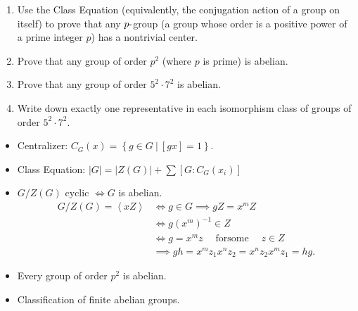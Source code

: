 \begin{enumerate}
\def\labelenumi{\alph{enumi}.}
\item
  Use the Class Equation (equivalently, the conjugation action of a
  group on itself) to prove that any \(p{\hbox{-}}\)group (a group whose
  order is a positive power of a prime integer \(p\)) has a nontrivial
  center.
\item
  Prove that any group of order \(p^2\) (where \(p\) is prime) is
  abelian.
\item
  Prove that any group of order \(5^2 \cdot 7^2\) is abelian.
\item
  Write down exactly one representative in each isomorphism class of
  groups of order \(5^2 \cdot 7^2\).
\end{enumerate}

\begin{concept}

\envlist

\begin{itemize}
\item
  Centralizer:
  \(C_G(x) = \left\{{g\in G {~\mathrel{\Big|}~}[gx] = 1}\right\}\).
\item
  Class Equation:
  \({\left\lvert {G} \right\rvert} = {\left\lvert {Z(G)} \right\rvert} + \sum [G: C_G(x_i)]\)
\item
  \(G/Z(G)\) cyclic \(\iff G\) is abelian.
  \begin{align*}
  G/Z(G) = \left\langle{xZ}\right\rangle 
  &\iff g\in G \implies gZ = x^mZ \\
  &\iff g(x^m)^{-1}\in Z \\
  &\iff g = x^m z {\quad \operatorname{for some} \quad}z\in Z\\
  &\implies gh = x^mz_1 x^n z_2 = x^n z_2 x^m z_1 = hg
  .\end{align*}
\item
  Every group of order \(p^2\) is abelian.
\item
  Classification of finite abelian groups.
\end{itemize}

\end{concept}

